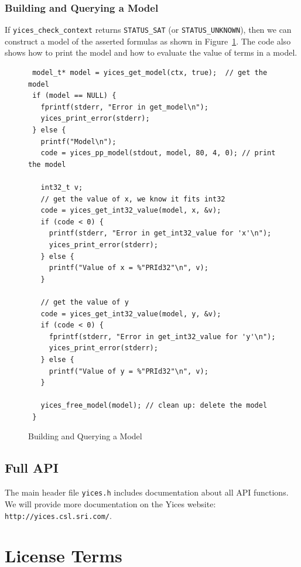 \documentclass[11pt,twoside,fleqn,openright,titlepage]{cslreport}
\begin{document}
\subsection*{Building and Querying a Model}

If \texttt{yices\_check\_context} returns \texttt{STATUS\_SAT} (or
\texttt{STATUS\_UNKNOWN}), then we can construct a model of the
asserted formulas as shown in Figure~\ref{model-query}. The code also
shows how to print the model and how to evaluate the value of terms in
a model.

\begin{figure}
\begin{footnotesize}
\begin{verbatim}
 model_t* model = yices_get_model(ctx, true);  // get the model
 if (model == NULL) {
   fprintf(stderr, "Error in get_model\n");
   yices_print_error(stderr);
 } else {
   printf("Model\n");
   code = yices_pp_model(stdout, model, 80, 4, 0); // print the model

   int32_t v;
   // get the value of x, we know it fits int32
   code = yices_get_int32_value(model, x, &v);
   if (code < 0) {
     printf(stderr, "Error in get_int32_value for 'x'\n");
     yices_print_error(stderr);
   } else {
     printf("Value of x = %"PRId32"\n", v);
   }

   // get the value of y
   code = yices_get_int32_value(model, y, &v);
   if (code < 0) {
     fprintf(stderr, "Error in get_int32_value for 'y'\n");
     yices_print_error(stderr);
   } else {
     printf("Value of y = %"PRId32"\n", v);
   }

   yices_free_model(model); // clean up: delete the model
 }
\end{verbatim}
\end{footnotesize}
\caption{Building and Querying a Model}
\label{model-query}
\end{figure}


\section{Full API}

The main header file \texttt{yices.h} includes documentation about all
API functions. We will provide more documentation on the Yices
website: \texttt{http://yices.csl.sri.com/}.


\chapter{License Terms}
\label{license}
\end{document}
